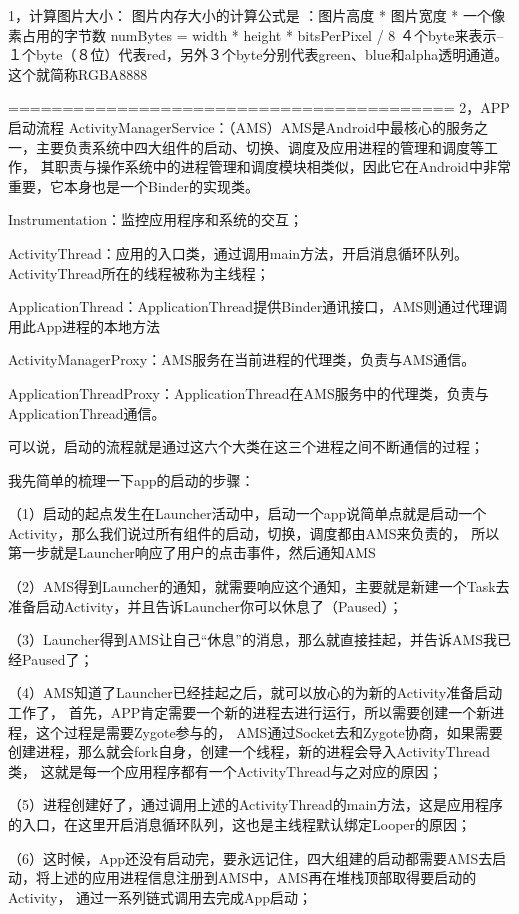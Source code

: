 1，计算图片大小：
图片内存大小的计算公式是 ：图片高度 * 图片宽度 * 一个像素占用的字节数
numBytes = width * height * bitsPerPixel / 8
４个byte来表示--１个byte（８位）代表red，另外３个byte分别代表green、blue和alpha透明通道。这个就简称RGBA8888

=========================================
2，APP 启动流程
ActivityManagerService：（AMS）AMS是Android中最核心的服务之一，主要负责系统中四大组件的启动、切换、调度及应用进程的管理和调度等工作，
                         其职责与操作系统中的进程管理和调度模块相类似，因此它在Android中非常重要，它本身也是一个Binder的实现类。

Instrumentation：监控应用程序和系统的交互；

ActivityThread：应用的入口类，通过调用main方法，开启消息循环队列。ActivityThread所在的线程被称为主线程；

ApplicationThread：ApplicationThread提供Binder通讯接口，AMS则通过代理调用此App进程的本地方法

ActivityManagerProxy：AMS服务在当前进程的代理类，负责与AMS通信。

ApplicationThreadProxy：ApplicationThread在AMS服务中的代理类，负责与ApplicationThread通信。

可以说，启动的流程就是通过这六个大类在这三个进程之间不断通信的过程；

我先简单的梳理一下app的启动的步骤：

（1）启动的起点发生在Launcher活动中，启动一个app说简单点就是启动一个Activity，那么我们说过所有组件的启动，切换，调度都由AMS来负责的，
    所以第一步就是Launcher响应了用户的点击事件，然后通知AMS

（2）AMS得到Launcher的通知，就需要响应这个通知，主要就是新建一个Task去准备启动Activity，并且告诉Launcher你可以休息了（Paused）；

（3）Launcher得到AMS让自己“休息”的消息，那么就直接挂起，并告诉AMS我已经Paused了；

（4）AMS知道了Launcher已经挂起之后，就可以放心的为新的Activity准备启动工作了，
    首先，APP肯定需要一个新的进程去进行运行，所以需要创建一个新进程，这个过程是需要Zygote参与的，
    AMS通过Socket去和Zygote协商，如果需要创建进程，那么就会fork自身，创建一个线程，新的进程会导入ActivityThread类，
    这就是每一个应用程序都有一个ActivityThread与之对应的原因；

（5）进程创建好了，通过调用上述的ActivityThread的main方法，这是应用程序的入口，在这里开启消息循环队列，这也是主线程默认绑定Looper的原因；

（6）这时候，App还没有启动完，要永远记住，四大组建的启动都需要AMS去启动，将上述的应用进程信息注册到AMS中，AMS再在堆栈顶部取得要启动的Activity，
    通过一系列链式调用去完成App启动；



